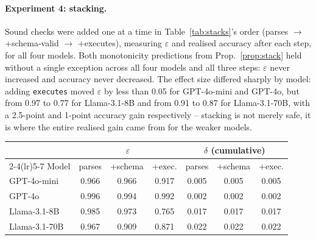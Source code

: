 \documentclass[11pt]{article}
\begin{document}
\paragraph{Experiment 4: stacking.} Sound checks were added one at a time in Table~\ref{tab:stacks}'s order (parses $\to$ +schema-valid $\to$ +executes), measuring $\varepsilon$ and realised accuracy after each step, for all four models. Both monotonicity predictions from Prop.~\ref{prop:stack} held without a single exception across all four models and all three steps: $\varepsilon$ never increased and accuracy never decreased. The effect size differed sharply by model: adding \texttt{executes} moved $\varepsilon$ by less than 0.05 for GPT-4o-mini and GPT-4o, but from 0.97 to 0.77 for Llama-3.1-8B and from 0.91 to 0.87 for Llama-3.1-70B, with a 2.5-point and 1-point accuracy gain respectively -- stacking is not merely safe, it is where the entire realised gain came from for the weaker models.

\begin{table}[h]\centering\footnotesize
\setlength{\tabcolsep}{3pt}
\begin{tabular}{@{}l ccc ccc@{}}
\toprule
& \multicolumn{3}{c}{$\varepsilon$} & \multicolumn{3}{c}{$\delta$ (cumulative)} \\
\cmidrule(lr){2-4}\cmidrule(lr){5-7}
Model & parses & +schema & +exec. & parses & +schema & +exec. \\
\midrule
GPT-4o-mini    & 0.966 & 0.966 & 0.917 & 0.005 & 0.005 & 0.005 \\
GPT-4o         & 0.996 & 0.994 & 0.992 & 0.002 & 0.002 & 0.002 \\
Llama-3.1-8B   & 0.985 & 0.973 & 0.765 & 0.017 & 0.017 & 0.017 \\
Llama-3.1-70B  & 0.967 & 0.909 & 0.871 & 0.022 & 0.022 & 0.022 \\
\bottomrule
\end{tabular}
\label{tab:stack-breakdown}
\end{table}
\end{document}
